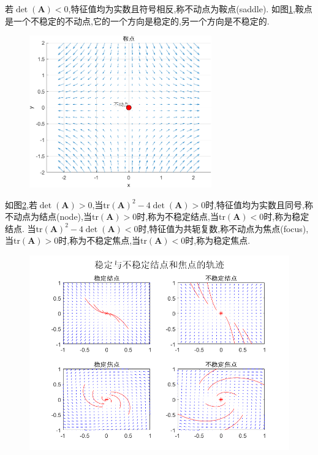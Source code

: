 若$\det(\mathbf{A})<0$,特征值均为实数且符号相反,称不动点为鞍点(saddle). 如图\ref{fig:saddle},鞍点是一个不稳定的不动点,它的一个方向是稳定的,另一个方向是不稳定的. 
\begin{figure}[H]
    \centering
    \includegraphics[width=0.7\textwidth]{Img/saddle.png}
    \label{fig:saddle}
\end{figure}

如图\ref{fig:node},若$\det(\mathbf{A})>0$,当$\text{tr}(\mathbf{A})^2-4\det(\mathbf{A})>0$时,特征值均为实数且同号,称不动点为结点(node),当$\text{tr}(\mathbf{A})>0$时,称为不稳定结点,当$\text{tr}(\mathbf{A})<0$时,称为稳定结点. 当$\text{tr}(\mathbf{A})^2-4\det(\mathbf{A})<0$时,特征值为共轭复数,称不动点为焦点(focus),当$\text{tr}(\mathbf{A})>0$时,称为不稳定焦点,当$\text{tr}(\mathbf{A})<0$时,称为稳定焦点. 

\begin{figure}[H]
    \centering
    \includegraphics[width=.7\linewidth]{Img/node.png}
    \label{fig:node}
\end{figure}

